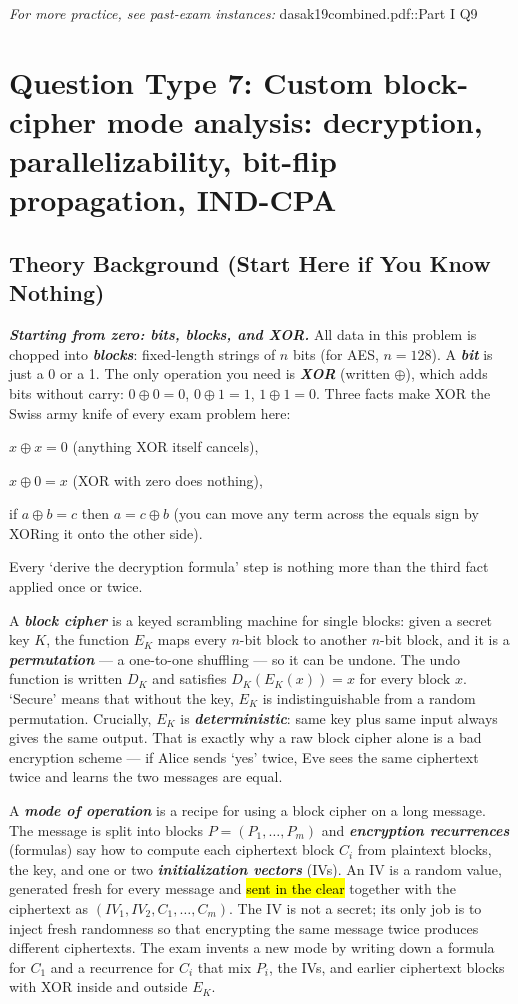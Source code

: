 \documentclass[12pt, a4paper]{article}
\newcommand{\term}[1]{\textbf{\textit{#1}}}        %
\newcommand{\imp}[1]{\hl{#1}}                       %
\begin{document}
\textit{For more practice, see past-exam instances:} dasak19combined.pdf::Part I Q9

\section{Question Type 7: Custom block-cipher mode analysis: decryption, parallelizability, bit-flip propagation, IND-CPA}

\subsection*{Theory Background (Start Here if You Know Nothing)}
\term{Starting from zero: bits, blocks, and XOR.} All data in this problem is chopped into \term{blocks}: fixed-length strings of $n$ bits (for AES, $n = 128$). A \term{bit} is just a 0 or a 1. The only operation you need is \term{XOR} (written $\oplus$), which adds bits without carry: $0 \oplus 0 = 0$, $0 \oplus 1 = 1$, $1 \oplus 1 = 0$. Three facts make XOR the Swiss army knife of every exam problem here: \begin{tightitem} \item $x \oplus x = 0$ (anything XOR itself cancels), \item $x \oplus 0 = x$ (XOR with zero does nothing), \item if $a \oplus b = c$ then $a = c \oplus b$ (you can move any term across the equals sign by XORing it onto the other side). \end{tightitem} Every `derive the decryption formula' step is nothing more than the third fact applied once or twice.

A \term{block cipher} is a keyed scrambling machine for single blocks: given a secret key $K$, the function $E_K$ maps every $n$-bit block to another $n$-bit block, and it is a \term{permutation} --- a one-to-one shuffling --- so it can be undone. The undo function is written $D_K$ and satisfies $D_K(E_K(x)) = x$ for every block $x$. `Secure' means that without the key, $E_K$ is indistinguishable from a random permutation. Crucially, $E_K$ is \term{deterministic}: same key plus same input always gives the same output. That is exactly why a raw block cipher alone is a bad encryption scheme --- if Alice sends `yes' twice, Eve sees the same ciphertext twice and learns the two messages are equal.

A \term{mode of operation} is a recipe for using a block cipher on a long message. The message is split into blocks $P = (P_1, \dots, P_m)$ and \term{encryption recurrences} (formulas) say how to compute each ciphertext block $C_i$ from plaintext blocks, the key, and one or two \term{initialization vectors} (IVs). An IV is a random value, generated fresh for every message and \imp{sent in the clear} together with the ciphertext as $(IV_1, IV_2, C_1, \dots, C_m)$. The IV is not a secret; its only job is to inject fresh randomness so that encrypting the same message twice produces different ciphertexts. The exam invents a new mode by writing down a formula for $C_1$ and a recurrence for $C_i$ that mix $P_i$, the IVs, and earlier ciphertext blocks with XOR inside and outside $E_K$.
\end{document}
